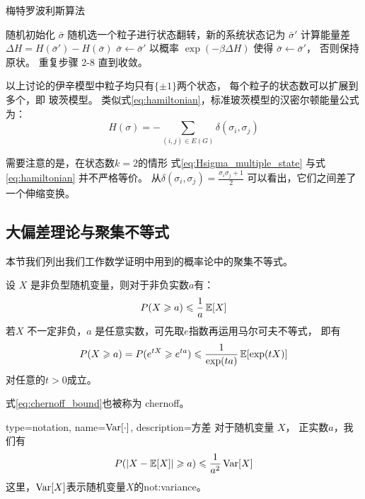 \begin{algorithm}
  \caption{梅特罗波利斯算法}\label{alg:Metropolis}
  \begin{algorithmic}[1]
    \STATE 随机初始化 $\bar{\sigma}$
    \STATE 随机选一个粒子进行状态翻转，新的系统状态记为 $\bar{\sigma}'$ 
    \STATE 计算能量差 $\Delta H= H(\bar{\sigma}') - H(\bar{\sigma})$
    \STATE $\bar{\sigma} \leftarrow \bar{\sigma}'$
    \ELSE
    \STATE 以概率 $\exp(-\beta \Delta H)$ 
    使得 $\bar{\sigma} \leftarrow \bar{\sigma}'$，
    否则保持原状。 
    \ENDIF
    \STATE 重复步骤 2-8 直到收敛。
\end{algorithmic}  
\end{algorithm}

以上讨论的伊辛模型中粒子均只有$\{\pm 1\}$两个状态，
每个粒子的状态数可以扩展到多个，即 玻茨模型\cite{potts1952some}。
类似式\eqref{eq:hamiltonian}，标准玻茨模型的汉密尔顿能量公式为：
\begin{equation}\label{eq:Hsigma_multiple_state}
  H(\sigma) = -\sum_{(i,j) \in E(G)}\delta(\sigma_i, \sigma_j)
\end{equation}
\begin{remark}\label{rem:equivalence_H_energy}
需要注意的是，在状态数$k=2$的情形
式\eqref{eq:Hsigma_multiple_state} 
与式\eqref{eq:hamiltonian}
并不严格等价。
从$\delta(\sigma_i, \sigma_j) = \frac{\sigma_i \sigma_j + 1}{2}$
可以看出，它们之间差了一个伸缩变换。
\end{remark}
\subsection{大偏差理论与聚集不等式}
本节我们列出我们工作数学证明中用到的概率论中的聚集不等式。

\begin{lemma} 
  设 $X$ 是非负型随机变量，则对于非负实数$a$有：
  \begin{equation}
    P(X\geqslant a) \leqslant {1 \over a} \operatorname{\mathbb{E}}[X]   
  \end{equation}
   若$X$ 不一定非负，$a$ 是任意实数，可先取$e$指数再运用马尔可夫不等式，
   即有
   \begin{equation}\label{eq:chernoff_bound}
    P(X\geqslant a) = P(e^{tX} \geqslant e^{ta}) \leqslant { 1 \over \exp(ta)} \operatorname{\mathbb{E}}[\exp(tX)]
   \end{equation}
   对任意的$t>0$成立。

   式\eqref{eq:chernoff_bound}也被称为 \gls{chernoff}。
\end{lemma}
\begin{lemma}
{
  type=notation,
  name={$\operatorname{\mathrm{Var}}[\cdot]$},
  description={方差}
}
  对于随机变量 $X$， 正实数$a$，我们有
  \begin{equation}
    P(\lvert X-\operatorname{\mathbb{E}}[X]\rvert \geqslant a) \leqslant {1 \over a^2} \operatorname{\mathrm{Var}}[X]
  \end{equation}
  这里，$\operatorname{\mathrm{Var}}[X]$表示随机变量$X$的\glsdesc{not:variance}。
\end{lemma}

